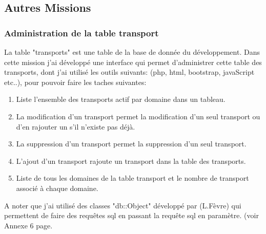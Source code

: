 \subsection{Autres Missions}

\subsubsection{Administration de la table transport}
La table "transports" est une table de la base de donnée du développement. Dans cette mission j'ai développé une interface qui permet d'administrer cette table des transports, dont j'ai utilisé les outils suivants: (php, html, bootstrap, javaScript etc..), pour pouvoir faire les taches suivantes:

\begin{enumerate}
\item Liste l'ensemble des transports actif par domaine dans un tableau.
\item La modification d'un transport permet la modification d'un seul transport ou d'en rajouter un s'il n'existe pas déjà.
\item La suppression d'un transport permet la suppression d'un seul transport.
\item L'ajout d'un transport rajoute un transport dans la table des transports.
\item Liste de tous les domaines de la table transport et le nombre de transport associé à chaque domaine.
\end{enumerate}
A noter que j'ai utilisé des classes "db::Object" développé par (L.Fèvre) qui permettent de faire des requêtes sql en passant la requête sql en paramètre. (voir Annexe 6 page.\pageref{transport}

